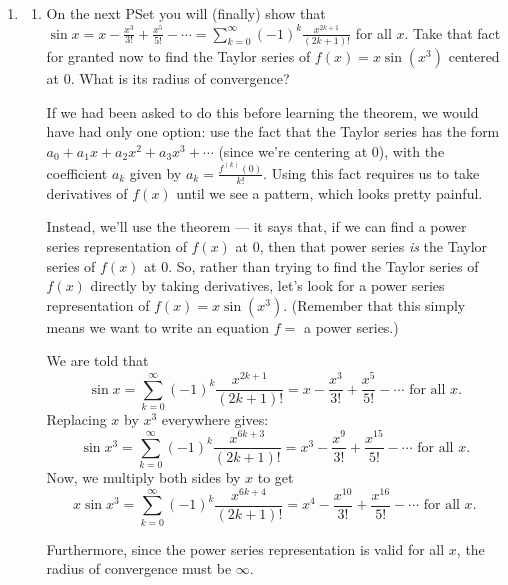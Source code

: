 \documentclass[main]{subfiles}
\begin{document}
\begin{enumerate}[resume]
\item 
\begin{enumerate}
  \item   {}
  
  \begin{problem}[\vfill]
  On the next PSet you will (finally) show that $\displaystyle \sin x =  x - \frac{x^3}{3!} +
  \frac{x^5}{5!} - \cdots= \sum_{k=0}^\infty
  (-1)^k \frac{x^{2k + 1}}{(2k + 1)!}$ for all $x$. Take that fact for granted now to find the Taylor series of $f(x) = x \sin (x^3)$ centered at $0$. What is its radius of convergence?
  \end{problem}

  \begin{solution}
  If we had been asked to do this before learning the theorem, we
  would have had only one option: use the fact that the Taylor series
  has the form $a_0 + a_1 x + a_2 x^2 + a_3 x^3 + \cdots$ (since we're
  centering at 0), with the coefficient $a_k$ given by $a_k =
  \frac{f^{(k)}(0)}{k!}$.  Using this fact requires us to take
  derivatives of $f(x)$ until we see a pattern, which looks pretty
  painful.

  Instead, we'll use the theorem --- it says that, if we can find a
  power series representation of $f(x)$ at $0$, then that power series
  \textit{is} the Taylor series of $f(x)$ at $0$.  So, rather than
  trying to find the Taylor series of $f(x)$ directly by taking
  derivatives, let's look for a power series representation of $f(x) =
  x \sin(x^3)$.  (Remember that this simply means we want to write an
  equation $f = $ a power series.)

  We are told that
  \[ \sin x = \displaystyle \sum_{k=0}^\infty (-1)^k \frac{x^{2k +
  1}}{(2k + 1)!} = x - \frac{x^3}{3!} + \frac{x^5}{5!} - \cdots
  \textrm{ for all } x.\] Replacing $x$ by $x^3$ everywhere gives:
  \[ \sin x^3 = \displaystyle \sum_{k=0}^\infty (-1)^k \frac{x^{6k +
  3}}{(2k + 1)!} = x^3 - \frac{x^9}{3!} + \frac{x^{15}}{5!} -
  \cdots \textrm{ for all } x.\] Now, we multiply both sides by $x$ to
  get
  \[ x \sin x^3 = \boxed{\sum_{k=0}^\infty (-1)^k \frac{x^{6k +
  4}}{(2k + 1)!}} = x^4 - \frac{x^{10}}{3!} + \frac{x^{16}}{5!}
  - \cdots \textrm{ for all } x.\]
  
  Furthermore, since the power series representation is valid for all $x$, the radius of convergence must be $\boxed{\infty}$.
  \end{solution}



\end{enumerate}
\end{enumerate}
\end{document}
